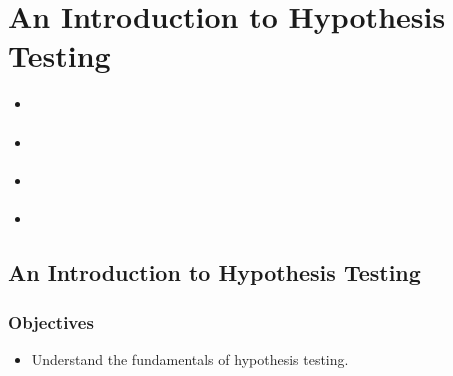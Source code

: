 \documentclass[letterpaper,10pt,english]{jupyterBook}
\begin{document}
\sphinxstepscope


\chapter{An Introduction to Hypothesis Testing}
\label{\detokenize{Ch6 An Introduction to Hypothesis Testing/6.0 An Introduction to Hypothesis Testing:an-introduction-to-hypothesis-testing}}\label{\detokenize{Ch6 An Introduction to Hypothesis Testing/6.0 An Introduction to Hypothesis Testing::doc}}\begin{itemize}
\item {} 
\sphinxAtStartPar
{\hyperref[\detokenize{Ch6 An Introduction to Hypothesis Testing/6.1 An Introduction to Hypothesis Testing::doc}]{}}

\item {} 
\sphinxAtStartPar
{\hyperref[\detokenize{Ch6 An Introduction to Hypothesis Testing/6.2 Hypotheses and Errors::doc}]{}}

\item {} 
\sphinxAtStartPar
{\hyperref[\detokenize{Ch6 An Introduction to Hypothesis Testing/6.3 Drawing a Conclusion::doc}]{}}

\item {} 
\sphinxAtStartPar
{\hyperref[\detokenize{Ch6 An Introduction to Hypothesis Testing/6.4 Hypothesis Tests of One Population::doc}]{}}

\end{itemize}

\sphinxstepscope


\section{An Introduction to Hypothesis Testing}
\label{\detokenize{Ch6 An Introduction to Hypothesis Testing/6.1 An Introduction to Hypothesis Testing:an-introduction-to-hypothesis-testing}}\label{\detokenize{Ch6 An Introduction to Hypothesis Testing/6.1 An Introduction to Hypothesis Testing::doc}}

\subsection{Objectives}
\label{\detokenize{Ch6 An Introduction to Hypothesis Testing/6.1 An Introduction to Hypothesis Testing:objectives}}\begin{itemize}
\item {} 
\sphinxAtStartPar
Understand the fundamentals of hypothesis testing.

\end{itemize}
\end{document}
